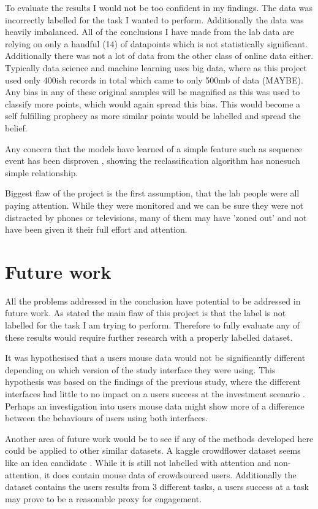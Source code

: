 \documentclass{article}
\begin{document}
To evaluate the results I would not be too confident in my findings.
The data was incorrectly labelled for the task I wanted to perform.
Additionally the data was heavily imbalanced.
All of the conclusions I have made from the lab data are relying on only a handful (14) of datapoints which is not statistically significant.
Additionally there was not a lot of data from the other class of online data either.
Typically data science and machine learning uses big data, where as this project used only 400ish records in total which came to only 500mb of data (MAYBE).
Any bias in any of these original samples will be magnified as this was used to classify more points, which would again spread this bias.
This would become a self fulfilling prophecy as more similar points would be labelled and spread the belief.

Any concern that the models have learned of a simple feature such as sequence event has been disproven
, showing the reclassification algorithm has nonesuch simple relationship.

Biggest flaw of the project is the first assumption, that the lab people were all paying attention.
While they were monitored and we can be sure they were not distracted by phones or televisions, many of them may have 'zoned out' and not have been given it their full effort and attention.


\section{Future work}

All the problems addressed in the conclusion have potential to be addressed in future work.
As stated the main flaw of this project is that the label is not labelled for the task I am trying to perform.
Therefore to fully evaluate any of these results would require further research with a properly labelled dataset.


It was hypothesised that a users mouse data would not be significantly different depending on which version of the study interface they were using.
This hypothesis was based on the findings of the previous study, where the different interfaces had little to no impact on a users success at the investment scenario \cite{gruber2017thesis}.
Perhaps an investigation into users mouse data might show more of a difference between the behaviours of users using both interfaces.

Another area of future work would be to see if any of the methods developed here could be applied to other similar datasets.
A kaggle crowdflower dataset seems like an idea candidate \cite{kaggleWorkerActivity}.
While it is still not labelled with attention and non-attention, it does contain mouse data of crowdsourced users.
Additionally the dataset contains the users results from 3 different tasks, a users success at a task may prove to be a reasonable proxy for engagement. 

\printbibliography
\end{document}
